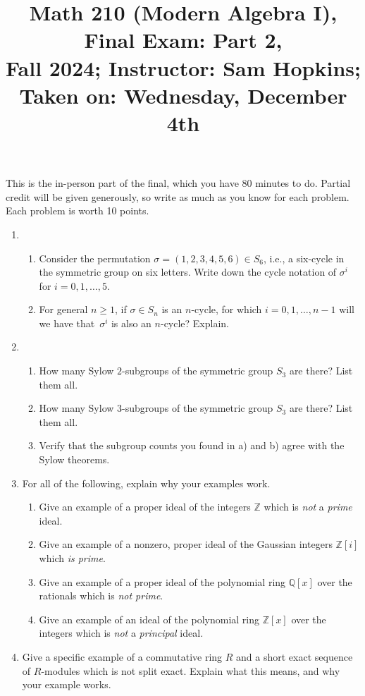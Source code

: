 \documentclass[11pt]{article}
\title{Math 210 (Modern Algebra I), Final Exam: Part 2, \\ {\normalsize Fall 2024; Instructor: Sam Hopkins; Taken on: Wednesday, December 4th}}
\date{}
\begin{document}
\maketitle

This is the in-person part of the final, which you have 80 minutes to do. Partial credit will be given generously, so write as much as you know for each problem. Each problem is worth 10 points. 

\thispagestyle{empty}
\begin{enumerate}

\item \begin{enumerate}
\item Consider the permutation $\sigma = (1,2,3,4,5,6) \in S_6$, i.e., a six-cycle in the symmetric group on six letters. Write down the cycle notation of $\sigma^{i}$ for $i=0,1,\ldots,5$.
\item For general $n \geq 1$, if $\sigma \in S_n$ is an $n$-cycle, for which $i=0,1,\ldots,n-1$ will we have that~$\sigma^{i}$ is also an $n$-cycle? Explain.
\end{enumerate}

\item \begin{enumerate}
\item How many Sylow $2$-subgroups of the symmetric group $S_3$ are there? List them all.
\item How many Sylow $3$-subgroups of the symmetric group $S_3$ are there? List them all.
\item Verify that the subgroup counts you found in a) and b) agree with the Sylow theorems.
\end{enumerate}

\item For all of the following, explain why your examples work.
\begin{enumerate}
\item Give an example of a proper ideal of the integers $\mathbb{Z}$ which is \emph{not} a \emph{prime} ideal.
\item Give an example of a nonzero, proper ideal of the Gaussian integers $\mathbb{Z}[i]$ which \emph{is prime}.
\item Give an example of a proper ideal of the polynomial ring $\mathbb{Q}[x]$ over the rationals which is \emph{not prime}.
\item Give an example of an ideal of the polynomial ring $\mathbb{Z}[x]$ over the integers which is \emph{not} a \emph{principal} ideal.
\end{enumerate}

\item Give a specific example of a commutative ring $R$ and a short exact sequence of $R$-modules which is not split exact. Explain what this means, and why your example works.

\end{enumerate}
\end{document}
